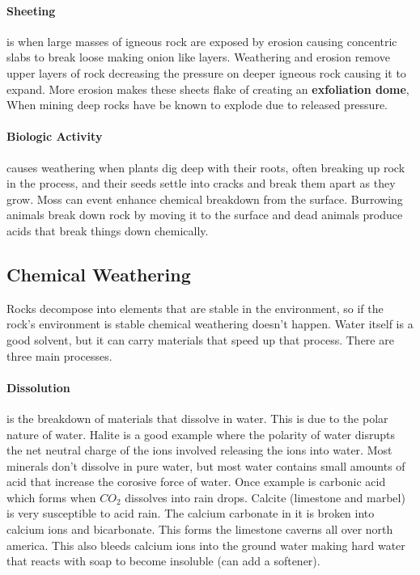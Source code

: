 \documentclass{article}
\begin{document}
\paragraph{Sheeting} %
\label{par:sheeting}
is when large masses of igneous rock are exposed by erosion causing concentric slabs to break loose making onion like layers. Weathering and erosion remove upper layers of rock decreasing the pressure on deeper igneous rock causing it to expand. More erosion makes these sheets flake of creating an \textbf{exfoliation dome}, When mining deep rocks have be known to explode due to released pressure.

\paragraph{Biologic Activity} %
\label{par:biologic_activity}
causes weathering when plants dig deep with their roots, often breaking up rock in the process, and their seeds settle into cracks and break them apart as they grow. Moss can event enhance chemical breakdown from the surface. Burrowing animals break down rock by moving it to the surface and dead animals produce acids that break things down chemically.

\subsection{Chemical Weathering} %
\label{sub:chemical_weathering}
Rocks decompose into elements that are stable in the environment, so if the rock's environment is stable chemical weathering doesn't happen. Water itself is a good solvent, but it can carry materials that speed up that process. There are three main processes.

\paragraph{Dissolution} %
\label{par:dissolution}
is the breakdown of materials that dissolve in water. This is due to the polar nature of water. Halite is a good example where the polarity of water disrupts the net neutral charge of the ions involved releasing the ions into water. Most minerals don't dissolve in pure water, but most water contains small amounts of acid that increase the corosive force of water. Once example is carbonic acid which forms when $CO_2$ dissolves into rain drops. Calcite (limestone and marbel) is very susceptible to acid rain. The calcium carbonate in it is broken into calcium ions and bicarbonate. This forms the limestone caverns all over north america. This also bleeds calcium ions into the ground water making hard water that reacts with soap to become insoluble (can add a softener).
\end{document}
